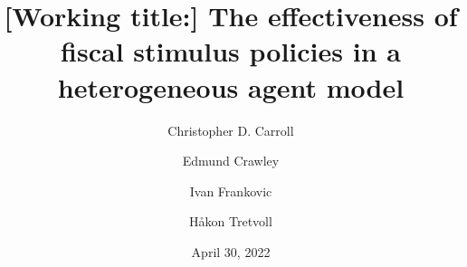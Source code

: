\documentclass[HAFiscal]{subfiles}
\providecommand{\versn}{pdf} %
\begin{document}
\ifthenelse{\boolean{Web}}{    %
  \renewcommand{\versn}{Web}     %
  \renewcommand{\rootFromOut}{.} %
}{}  %



\title{[Working title:] The effectiveness of fiscal stimulus policies in a heterogeneous agent model}

\author{Christopher D. Carroll\authNum \and Edmund Crawley\authNum \and Ivan Frankovic\authNum \and H{\aa}kon Tretvoll\authNum}

\keywords{}


\renewcommand{\forcedate}{April 30, 2022}\date{\forcedate}

\maketitle
\hypertarget{abstract}{}

\hypertarget{links}{}
\end{document}
